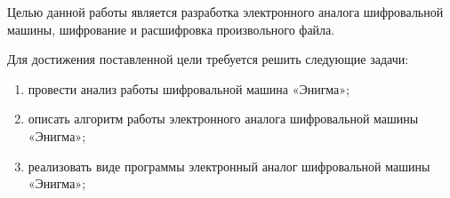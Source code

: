 %
%
%


Целью данной работы является разработка электронного аналога шифровальной машины, шифрование и расшифровка произвольного файла. 


Для достижения поставленной цели требуется решить следующие задачи:
\begin{enumerate}[label={\arabic*)}]
	\item провести анализ работы шифровальной машина «Энигма»;
	\item описать алгоритм работы электронного аналога шифровальной машины «Энигма»;
	\item реализовать виде программы электронный аналог шифровальной машины «Энигма»;
\end{enumerate}


\clearpage
